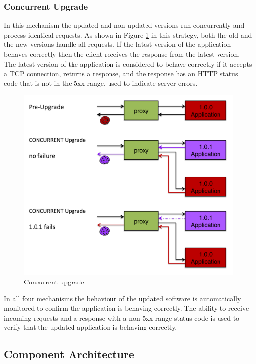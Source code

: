 \documentclass[a4paper,11pt,twoside]{report}
\begin{document}
\subsubsection*{Concurrent Upgrade}
In this mechanism the updated and non-updated versions run concurrently and process identical requests.  As shown in Figure \ref{concurrent_upgrade} in this strategy, both the old and the new versions handle all requests.  If the latest version of the application behaves correctly then the client receives the response from the latest version.  The latest version of the application is considered to behave correctly if it accepts a TCP connection, returns a response, and the response has an HTTP status code that is not in the 5xx range, used to indicate server errors.
   
\begin{figure}[!ht]
  \centering
     \includegraphics[scale=0.30]{concurrent_upgrade}
  \caption{Concurrent upgrade}
  \label{concurrent_upgrade}
\end{figure}

In all four mechanisms the behaviour of the updated software is automatically monitored to confirm the application is behaving correctly. The ability to receive incoming requests and a response with a non 5xx range status code is used to verify that the updated application is behaving correctly. 


\subsection{Component Architecture}
\end{document}
